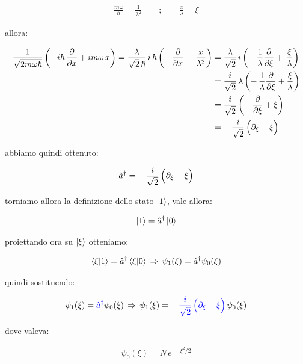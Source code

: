 \begin{align*}
	\frac{m\omega}{\hbar} = \frac{1}{\lambda^2} \qquad ; \qquad \frac{x}{\lambda} = \xi
\end{align*}

	allora:
	
\begin{align*}
	\frac{1}{\sqrt{2m\omega \hbar}} \, \qty(- i \hbar \, \pdv{x} + im\omega \, x) = \frac{\lambda}{\sqrt{2} \, \hbar} \, i \, \hbar \,  \qty(-  \, \pdv{x} +  \, \frac{x}{\lambda^2}) &= \frac{\lambda}{\sqrt{2}} \, i \,  \qty(-  \, \frac{1}{\lambda} \pdv{\xi} +  \, \frac{\xi}{\lambda})  \\
	& = \frac{i}{\sqrt{2}}\, \lambda \,  \qty(-  \, \frac{1}{\lambda} \pdv{\xi} +  \frac{\xi}{\lambda}) \\
	& =  \frac{i}{\sqrt{2}} \,  \qty(-  \,\pdv{\xi} +  \xi) \\
	& =  - \, \frac{i}{\sqrt{2}} \,  \qty\Big( \partial_{\xi} - \xi)
\end{align*}

	abbiamo quindi ottenuto:
	
\begin{align*}
	\hat{a}^{\dagger} = - \, \frac{i}{\sqrt{2}} \,  \qty\Big( \partial_{\xi} - \xi)
\end{align*}

	torniamo allora la definizione dello stato $\ket{1}$, vale allora:
	
\begin{align*}
	\ket{1} = \hat{a}^{\dagger} \ket{0} 
\end{align*}

	proiettando ora su $\ket{\xi}$
otteniamo:

\begin{align*}
	\braket{\xi}{1} = \hat{a}^{\dagger} \braket{\xi}{0} \, \Rightarrow \, \psi_1(\xi) = \hat{a}^{\dagger} \psi_0(\xi)
\end{align*}

	quindi sostituendo:
	
\begin{align*}
	\psi_1(\xi) = \textcolor{blue}{\hat{a}^{\dagger} } \psi_0(\xi) \, \Rightarrow \, \psi_1(\xi) = \textcolor{blue}{  - \, \frac{i}{\sqrt{2}} \,  \qty\Big( \partial_{\xi} - \xi) } \, \psi_0(\xi)
\end{align*}
	
	dove valeva:
	
\begin{align*}
	\psi_0(\xi) = N \, e^{\, -\xi^2/2}
\end{align*}

